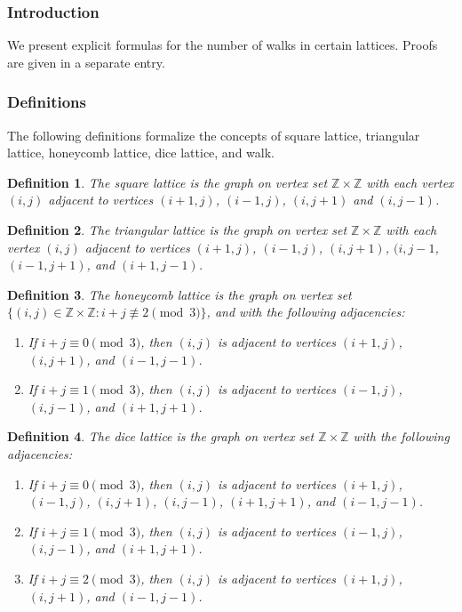 \documentclass[12pt]{article}
\begin{document}
\newtheorem*{defs}{Definition}

\subsubsection*{Introduction}
We present explicit formulas for the number of walks in certain lattices.  Proofs are given in a separate entry.
\subsubsection*{Definitions}

The following definitions formalize the concepts of square lattice, triangular lattice, honeycomb lattice, dice lattice, and walk.
\begin{defs}
The {\em square lattice} is the graph on vertex set $\mathbb{Z} \times \mathbb{Z}$ with each vertex $(i,j)$ adjacent to vertices $(i+1,j)$, $(i-1,j)$, $(i, j+1)$ and $(i, j-1)$.
\end{defs}

\begin{defs}
The {\em triangular lattice} is the graph on vertex set $\mathbb{Z} \times \mathbb{Z}$ with each vertex $(i,j)$ adjacent to vertices $(i+1,j)$, $(i-1,j)$, $(i,j+1)$, $(i,j-1$, $(i-1,j+1)$, and $(i+1,j-1)$.
\end{defs}

\begin{defs} 
The {\em honeycomb lattice} is the graph on vertex set $\{(i,j) \in \mathbb{Z} \times \mathbb{Z} : i+j \not\equiv 2 \pmod 3 \}$, and with the following adjacencies:
\begin{enumerate}
\item If $i + j \equiv 0 \pmod 3$, then $(i,j)$ is adjacent to vertices $(i+1,j)$, $(i,j+1)$, and $(i-1,j-1)$.
\item If $i + j \equiv 1 \pmod 3$, then $(i,j)$  is adjacent to vertices $(i-1,j)$, $(i,j-1)$, and $(i+1,j+1)$.
\end{enumerate}
\end{defs}

\begin{defs}
The {\em dice lattice}  is the graph on vertex set $\mathbb{Z} \times \mathbb{Z}$ with the following adjacencies:
\begin{enumerate}
\item If $i + j \equiv 0 \pmod 3$, then $(i,j)$ is adjacent to vertices $(i+1,j)$, $(i-1,j)$, $(i,j+1)$, $(i,j-1)$, $(i+1,j+1)$, and $(i-1,j-1)$.
\item If $i + j \equiv 1 \pmod 3$, then $(i,j)$  is adjacent to vertices $(i-1,j)$, $(i,j-1)$, and $(i+1,j+1)$.
\item If $i + j \equiv 2 \pmod 3$, then $(i,j)$ is adjacent to vertices $(i+1,j)$, $(i, j+1)$, and $(i-1,j-1)$.
\end{enumerate}

\end{defs}
\end{document}

